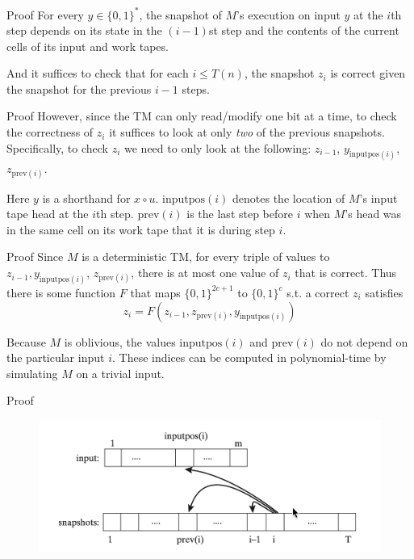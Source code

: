 \documentclass[presentation]{beamer}
\begin{document}
\begin{frame}[label={sec:org1741654}]{Proof}
For every \(y\in\{0,1\}^*\), the snapshot of \(M\)'s execution on input \(y\) at the \(i\)th
step depends on its state in the \((i-1)\)st step and the contents of the current cells of its
input and work tapes.

And it suffices to check that for each \(i\le T(n)\), the snapshot \(z_i\) is correct
given the snapshot for the previous \(i-1\) steps.
\end{frame}
\begin{frame}[label={sec:orgcc11729}]{Proof}
However, since the TM can only read/modify
 one bit at a time, to check the correctness of \(z_i\) it suffices to look at only \emph{two} of the
 previous snapshots. Specifically, to check \(z_i\) we need to only look at the following:
 \(z_{i-1}\), \(y_{\text{inputpos}(i)}\), \(z_{\text{prev}(i)}\).

Here \(y\) is a shorthand
for \(x\circ u\). \(\text{inputpos}(i)\) denotes the location of \(M\)'s input tape head at
the \(i\)th step. \(\text{prev}(i)\) is the last step before \(i\) when \(M\)'s head was in the
same cell on its work tape that it is during step \(i\).
\end{frame}
\begin{frame}[label={sec:orgbfac464}]{Proof}
Since \(M\) is a deterministic TM, for every triple of values
to \(z_{i-1},y_{\text{inputpos}(i)}\), \(z_{\text{prev}(i)}\), there is at most one value
of \(z_i\) that is correct. Thus there is some function \(F\) that maps \(\{0,1\}^{2c+1}\)
to \(\{0,1\}^c\) s.t. a correct \(z_i\) satisfies
     \begin{equation*}
z_i=F(z_{i-1},z_{\text{prev}(i)},y_{\text{inputpos}(i)})
     \end{equation*}

Because \(M\) is oblivious, the values \(\text{inputpos}(i)\) and \(\text{prev}(i)\) do not
depend on the particular input \(i\). These indices can be computed in polynomial-time by
simulating \(M\) on a trivial input.
\end{frame}
\begin{frame}[label={sec:orgc1aa9b0}]{Proof}
\begin{figure}[htbp]
\centering
\includegraphics[width=.8\textwidth]{./2.png}
\label{}
\end{figure}
\end{frame}
\end{document}
